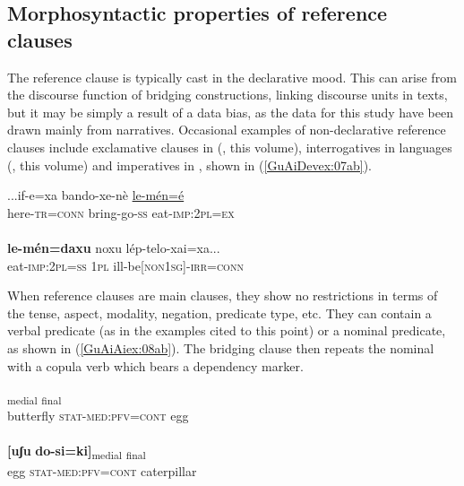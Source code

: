 \documentclass[output=paper]{LSP/langsci}
\begin{document}
\subsection{Morphosyntactic properties of reference clauses}
\label{GuAi2.2Morphosy.ref.cl}

The reference clause is typically cast in the declarative mood. This can arise from the discourse function of bridging constructions, linking discourse units in  texts, but it may be simply a result of a data bias, as the data for this study have been drawn mainly from narratives. Occasional examples of non-declarative reference clauses include exclamative clauses in  (\citeauthor{guerinchap18}, this volume), interrogatives in  languages (\citeauthor{anker18}, this volume) and imperatives in , shown in (\ref{GuAiDevex:07ab}).

\begin{exe}
\ex \label{GuAiDevex:07ab}
\begin{xlist}
\ex \label{GuAiDevex:07a}						
\gll ...if-e=xa bando-xe-nè \underline{le-mén=é}\\
here-\textsc{tr=conn} bring-go-\textsc{ss} eat-\textsc{imp:2pl=ex}\\
\glt {}\\
\ex \label{GuAiDevex:07b}						
\gll \textbf{le-mén=daxu} noxu  lép-telo-xai=xa...\\
eat-\textsc{imp:2pl=ss} \textsc{1pl} ill-be\textsc{[non1sg]-irr=conn} \\
\glt {} 
\end{xlist}
\end{exe}


When reference clauses are main clauses, they show no restrictions in terms of the tense, aspect, modality, negation, predicate type, etc. They can contain a verbal predicate (as in the examples cited to this point) or a nominal predicate, as shown in (\ref{GuAiAiex:08ab}). The bridging clause then repeats the nominal with a copula verb which bears a dependency marker.


\begin{exe}
\ex \label{GuAiAiex:08ab}
\begin{xlist}
\ex \label{GuAiAiex:08a}
\gll [ɛjaːgɛ	do-si=ki]\textsubscript{medial} \underline{\smash{[uʃu]}}\textsubscript{final}\\
butterfly \textsc{stat}-\textsc{med}:\textsc{pfv}=\textsc{cont} egg\\
\glt {}\\
\ex \label{GuAiAiex:08b}
\gll \textbf{[uʃu}	\textbf{do-si=ki]}\textsubscript{medial}	\underline{\smash{[kɛkɛbɛaːnɛ]}}\textsubscript{final}\\
egg	\textsc{stat}-\textsc{med}:\textsc{pfv}=\textsc{cont} caterpillar\\
\glt {}
\end{xlist}
\end{exe}
\end{document}
